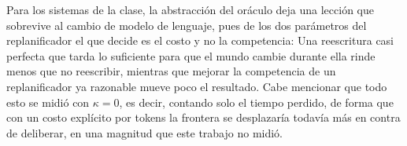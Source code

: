 Para los sistemas de la clase, la abstracción del oráculo deja una lección que sobrevive al cambio de modelo de lenguaje, pues de los dos parámetros del replanificador el que decide es el costo y no la competencia: Una reescritura casi perfecta que tarda lo suficiente para que el mundo cambie durante ella rinde menos que no reescribir, mientras que mejorar la competencia de un replanificador ya razonable mueve poco el resultado. Cabe mencionar que todo esto se midió con $\kappa=0$, es decir, contando solo el tiempo perdido, de forma que con un costo explícito por tokens la frontera se desplazaría todavía más en contra de deliberar, en una magnitud que este trabajo no midió.
